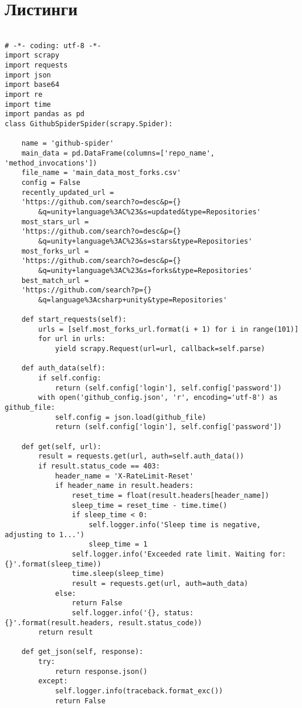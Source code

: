 \chapter{Листинги}
\begin{lstlisting}[caption={Исходный код класса обработки веб-страниц проектов с сайта GitHub.com},label=spider]

# -*- coding: utf-8 -*-
import scrapy
import requests
import json
import base64
import re
import time
import pandas as pd
class GithubSpiderSpider(scrapy.Spider):

	name = 'github-spider'
	main_data = pd.DataFrame(columns=['repo_name', 'method_invocations'])
	file_name = 'main_data_most_forks.csv'
	config = False
	recently_updated_url = 
	'https://github.com/search?o=desc&p={}
		&q=unity+language%3AC%23&s=updated&type=Repositories'
	most_stars_url = 
	'https://github.com/search?o=desc&p={}
		&q=unity+language%3AC%23&s=stars&type=Repositories'
	most_forks_url = 
	'https://github.com/search?o=desc&p={}
		&q=unity+language%3AC%23&s=forks&type=Repositories'
	best_match_url = 
	'https://github.com/search?p={}
		&q=language%3Acsharp+unity&type=Repositories'

	def start_requests(self):
		urls = [self.most_forks_url.format(i + 1) for i in range(101)]
		for url in urls:
			yield scrapy.Request(url=url, callback=self.parse)
	
	def auth_data(self):
		if self.config:
			return (self.config['login'], self.config['password'])
		with open('github_config.json', 'r', encoding='utf-8') as github_file:
			self.config = json.load(github_file)
			return (self.config['login'], self.config['password'])
		
	def get(self, url):
		result = requests.get(url, auth=self.auth_data())
		if result.status_code == 403:
			header_name = 'X-RateLimit-Reset'
			if header_name in result.headers:
				reset_time = float(result.headers[header_name])
				sleep_time = reset_time - time.time()
				if sleep_time < 0:
					self.logger.info('Sleep time is negative, adjusting to 1...')
					sleep_time = 1
				self.logger.info('Exceeded rate limit. Waiting for: {}'.format(sleep_time))
				time.sleep(sleep_time)
				result = requests.get(url, auth=auth_data)
			else:
				return False
				self.logger.info('{}, status: {}'.format(result.headers, result.status_code))
		return result
	
	def get_json(self, response):
		try:
			return response.json()
		except:
			self.logger.info(traceback.format_exc())
			return False
	

\end{lstlisting}

